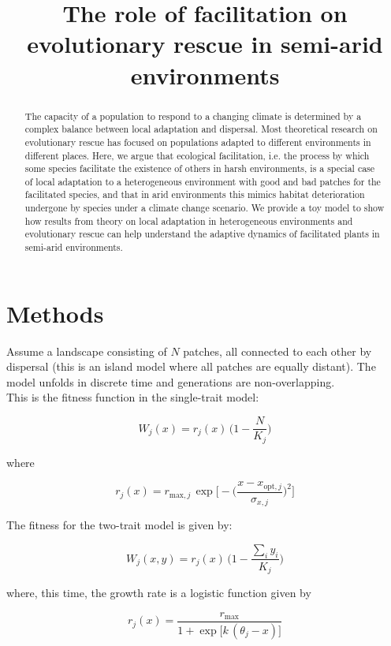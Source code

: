 \documentclass[]{article}
\title{The role of facilitation on evolutionary rescue in semi-arid environments}
\author{}
\begin{document}
\maketitle

\begin{abstract}
	
The capacity of a population to respond to a changing climate is determined by a complex balance between local adaptation and dispersal.
Most theoretical research on evolutionary rescue has focused on populations adapted to different environments in different places.
Here, we argue that ecological facilitation, i.e. the process by which some species facilitate the existence of others in harsh environments, is a special case of local adaptation to a heterogeneous environment with good and bad patches for the facilitated species, and that in arid environments this mimics habitat deterioration undergone by species under a climate change scenario. 
We provide a toy model to show how results from theory on local adaptation in heterogeneous environments and evolutionary rescue can help understand the adaptive dynamics of facilitated plants in semi-arid environments.

\end{abstract}

\section*{Methods}

Assume a landscape consisting of $N$ patches, all connected to each other by dispersal (this is an island model where all patches are equally distant).
The model unfolds in discrete time and generations are non-overlapping.\\

This is the fitness function in the single-trait model:

\begin{equation}
	W_j(x) = r_j(x) \, \bigg( 1 - \frac{N}{K_j} \bigg)
\end{equation}

where 

\begin{equation}
	r_j(x) = r_{\text{max}, j} \, \exp \Bigg[ -\bigg( \frac{x - x_{\text{opt}, j}}{\sigma_{x,j}} \bigg)^2 \Bigg]
\end{equation}

The fitness for the two-trait model is given by:

\begin{equation}
		W_j(x,y) = r_j(x) \, \bigg( 1 - \frac{\sum_i y_i}{K_j} \bigg)
\end{equation}

where, this time, the growth rate is a logistic function given by

\begin{equation}
	r_j(x) = \frac{r_{\text{max}}}{1 + \exp \big[ k \, (\theta_j - x) \big]}
\end{equation}
\end{document}
